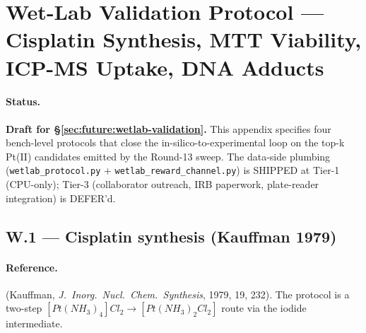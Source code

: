 %

\section{Wet-Lab Validation Protocol --- Cisplatin Synthesis,
         MTT Viability, ICP-MS Uptake, DNA Adducts}
\label{appendix:wetlab-protocol}

\paragraph{Status.}
\textbf{Draft for §\ref{sec:future:wetlab-validation}.}
This appendix specifies four bench-level protocols that close
the in-silico-to-experimental loop on the top-k Pt(II)
candidates emitted by the Round-13 sweep.  The data-side
plumbing (\texttt{wetlab\_protocol.py} +
\texttt{wetlab\_reward\_channel.py}) is SHIPPED at Tier-1
(CPU-only); Tier-3 (collaborator outreach, IRB paperwork,
plate-reader integration) is DEFER'd.

\subsection{W.1 --- Cisplatin synthesis (Kauffman 1979)}
\label{appendix:W-synthesis}

\paragraph{Reference.}
\citet{kauffman1979cisplatin} (Kauffman, \emph{J.~Inorg.~Nucl.~Chem.~Synthesis},
1979, 19, 232).  The protocol is a two-step
$[Pt(NH_3)_4]Cl_2 \to [Pt(NH_3)_2Cl_2]$ route via the
iodide intermediate.

